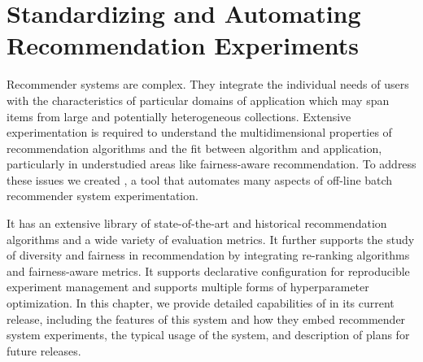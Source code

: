 
\chapter{Standardizing and Automating Recommendation Experiments}
\label{ch:librec-auto}

Recommender systems are complex. They integrate the individual needs of users with the characteristics of particular domains of application which may span items from large and potentially heterogeneous collections. Extensive experimentation is required to understand the multidimensional properties of recommendation algorithms and the fit between algorithm and application, particularly in understudied areas like fairness-aware recommendation. To address these issues we created \libauto{}, a tool that automates many aspects of off-line batch recommender system experimentation.  

It has an extensive library of state-of-the-art and historical recommendation algorithms and a wide variety of evaluation metrics. It further supports the study of diversity and fairness in recommendation by integrating re-ranking algorithms and fairness-aware metrics. It supports declarative configuration for reproducible experiment management and supports multiple forms of hyperparameter optimization. In this chapter, we provide detailed capabilities of \libauto{} in its current release, including the features of this system and how they embed recommender system experiments, the typical usage of the system, and description of plans for future releases.







